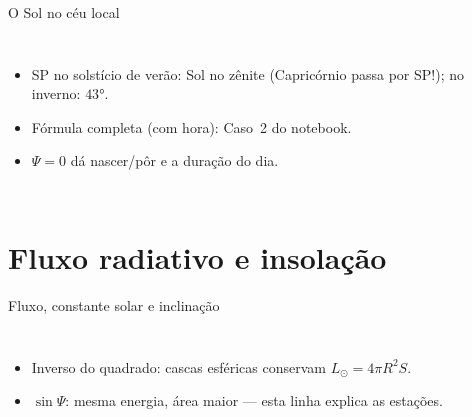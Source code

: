 \documentclass[aspectratio=169,11pt]{beamer}
\begin{document}
\begin{frame}{O Sol no céu local}
  \begin{columns}
    \vspace{0.4em}
    \begin{itemize}
      \item SP no solstício de verão: Sol no \alert{zênite} (Capricórnio
            passa por SP!); no inverno: $43°$.
      \item Fórmula completa (com hora): Caso~2 do notebook.
      \item $\Psi = 0$ dá nascer/pôr e a duração do dia.
    \end{itemize}
  \end{columns}
\end{frame}

\section{Fluxo radiativo e insolação}

\begin{frame}{Fluxo, constante solar e inclinação}
  \begin{columns}
    \vspace{0.4em}
    \begin{itemize}
      \item Inverso do quadrado: cascas esféricas conservam
            $L_\odot = 4\pi R^2 S$.
      \item $\sin\Psi$: mesma energia, área maior — \alert{esta linha
            explica as estações}.
    \end{itemize}
  \end{columns}
\end{frame}
\end{document}
